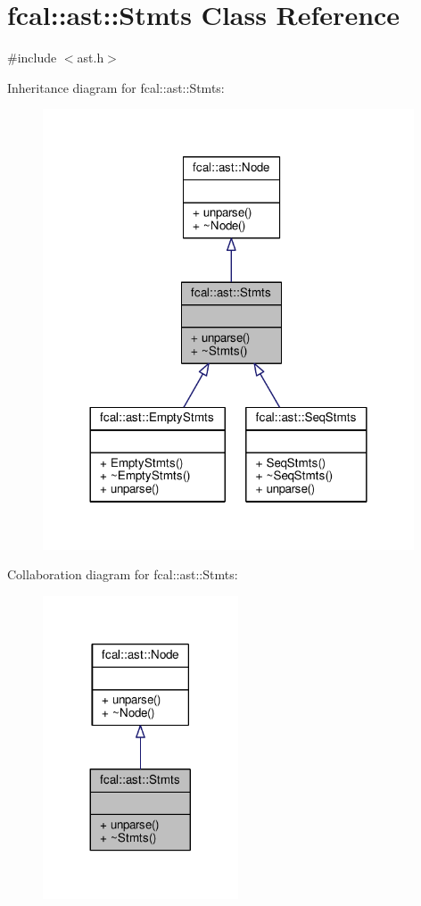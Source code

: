 \hypertarget{classfcal_1_1ast_1_1Stmts}{}\section{fcal\+:\+:ast\+:\+:Stmts Class Reference}
\label{classfcal_1_1ast_1_1Stmts}


{\ttfamily \#include $<$ast.\+h$>$}



Inheritance diagram for fcal\+:\+:ast\+:\+:Stmts\+:
\nopagebreak
\begin{figure}[H]
\begin{center}
\leavevmode
\includegraphics[width=312pt]{classfcal_1_1ast_1_1Stmts__inherit__graph}
\end{center}
\end{figure}


Collaboration diagram for fcal\+:\+:ast\+:\+:Stmts\+:
\nopagebreak
\begin{figure}[H]
\begin{center}
\leavevmode
\includegraphics[width=164pt]{classfcal_1_1ast_1_1Stmts__coll__graph}
\end{center}
\end{figure}
